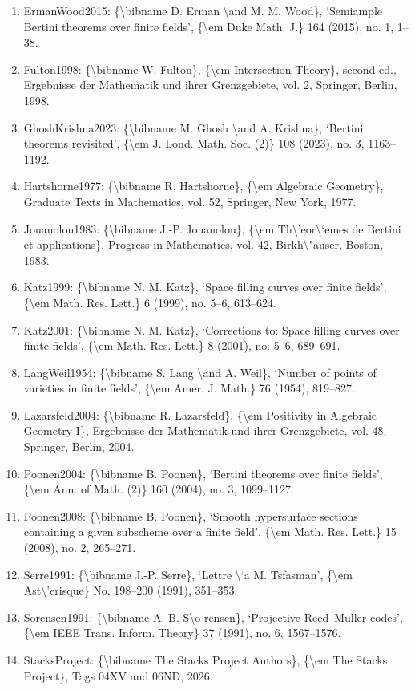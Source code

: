 \documentclass[11pt]{article}
\begin{document}
\begin{enumerate}[leftmargin=*]
  \item ErmanWood2015: \{\textbackslash{}bibname D. Erman \textbackslash{}and M. M. Wood\}, `Semiample Bertini theorems over finite fields', \{\textbackslash{}em Duke Math. J.\} 164 (2015), no. 1, 1--38.
  \item Fulton1998: \{\textbackslash{}bibname W. Fulton\}, \{\textbackslash{}em Intersection Theory\}, second ed., Ergebnisse der Mathematik und ihrer Grenzgebiete, vol. 2, Springer, Berlin, 1998.
  \item GhoshKrishna2023: \{\textbackslash{}bibname M. Ghosh \textbackslash{}and A. Krishna\}, `Bertini theorems revisited', \{\textbackslash{}em J. Lond. Math. Soc. (2)\} 108 (2023), no. 3, 1163--1192.
  \item Hartshorne1977: \{\textbackslash{}bibname R. Hartshorne\}, \{\textbackslash{}em Algebraic Geometry\}, Graduate Texts in Mathematics, vol. 52, Springer, New York, 1977.
  \item Jouanolou1983: \{\textbackslash{}bibname J.-P. Jouanolou\}, \{\textbackslash{}em Th\textbackslash{}'eor\textbackslash{}`emes de Bertini et applications\}, Progress in Mathematics, vol. 42, Birkh\textbackslash{}"auser, Boston, 1983.
  \item Katz1999: \{\textbackslash{}bibname N. M. Katz\}, `Space filling curves over finite fields', \{\textbackslash{}em Math. Res. Lett.\} 6 (1999), no. 5--6, 613--624.
  \item Katz2001: \{\textbackslash{}bibname N. M. Katz\}, `Corrections to: Space filling curves over finite fields', \{\textbackslash{}em Math. Res. Lett.\} 8 (2001), no. 5--6, 689--691.
  \item LangWeil1954: \{\textbackslash{}bibname S. Lang \textbackslash{}and A. Weil\}, `Number of points of varieties in finite fields', \{\textbackslash{}em Amer. J. Math.\} 76 (1954), 819--827.
  \item Lazarsfeld2004: \{\textbackslash{}bibname R. Lazarsfeld\}, \{\textbackslash{}em Positivity in Algebraic Geometry I\}, Ergebnisse der Mathematik und ihrer Grenzgebiete, vol. 48, Springer, Berlin, 2004.
  \item Poonen2004: \{\textbackslash{}bibname B. Poonen\}, `Bertini theorems over finite fields', \{\textbackslash{}em Ann. of Math. (2)\} 160 (2004), no. 3, 1099--1127.
  \item Poonen2008: \{\textbackslash{}bibname B. Poonen\}, `Smooth hypersurface sections containing a given subscheme over a finite field', \{\textbackslash{}em Math. Res. Lett.\} 15 (2008), no. 2, 265--271.
  \item Serre1991: \{\textbackslash{}bibname J.-P. Serre\}, `Lettre \textbackslash{}`a M. Tsfasman', \{\textbackslash{}em Ast\textbackslash{}'erisque\} No. 198--200 (1991), 351--353.
  \item Sorensen1991: \{\textbackslash{}bibname A. B. S\textbackslash{}o rensen\}, `Projective Reed--Muller codes', \{\textbackslash{}em IEEE Trans. Inform. Theory\} 37 (1991), no. 6, 1567--1576.
  \item StacksProject: \{\textbackslash{}bibname The Stacks Project Authors\}, \{\textbackslash{}em The Stacks Project\}, Tags 04XV and 06ND, 2026.
\end{enumerate}

% 
% 
\end{document}
